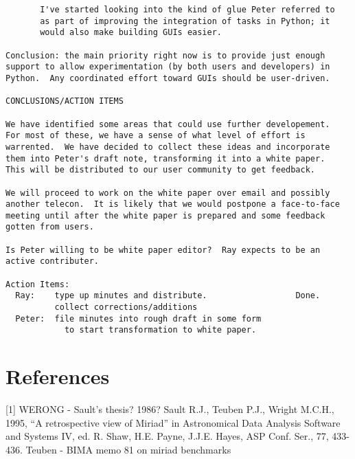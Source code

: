 \begin{verbatim}
       I've started looking into the kind of glue Peter referred to
       as part of improving the integration of tasks in Python; it
       would also make building GUIs easier.  

Conclusion: the main priority right now is to provide just enough
support to allow experimentation (by both users and developers) in
Python.  Any coordinated effort toward GUIs should be user-driven. 

CONCLUSIONS/ACTION ITEMS

We have identified some areas that could use further developement.
For most of these, we have a sense of what level of effort is
warrented.  We have decided to collect these ideas and incorporate
them into Peter's draft note, transforming it into a white paper.
This will be distributed to our user community to get feedback.  

We will proceed to work on the white paper over email and possibly
another telecon.  It is likely that we would postpone a face-to-face
meeting until after the white paper is prepared and some feedback
gotten from users.  

Is Peter willing to be white paper editor?  Ray expects to be an
active contributer.

Action Items:
  Ray:    type up minutes and distribute.                  Done.
          collect corrections/additions
  Peter:  file minutes into rough draft in some form
            to start transformation to white paper.

\end{verbatim}

\section*{References}

[1] WERONG - Sault's thesis? 1986?
\newline
[2] Sault R.J., Teuben P.J., Wright M.C.H., 1995,
 ``A retrospective view of Miriad'' in 
Astronomical Data Analysis Software and Systems IV, 
ed. R. Shaw, H.E. Payne, J.J.E. Hayes, ASP Conf. Ser., 77, 433-436.
\newline
[3] Teuben - BIMA memo 81 on miriad benchmarks
\newline


